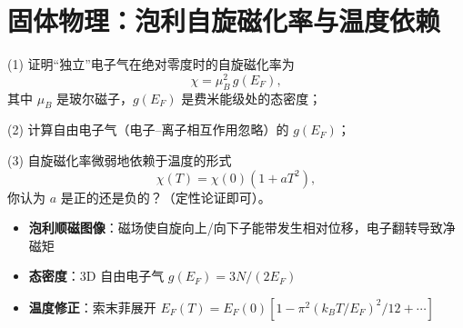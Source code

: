 \section{固体物理：泡利自旋磁化率与温度依赖}
\label{sec:pauli-susceptibility}

\begin{modelbox}[题目：独立电子气的自旋磁化率]
(1) 证明``独立''电子气在绝对零度时的自旋磁化率为
\begin{equation*}
\chi=\mu_B^2\,g(E_F),
\end{equation*}
其中 $\mu_B$ 是玻尔磁子，$g(E_F)$ 是费米能级处的态密度；

(2) 计算自由电子气（电子--离子相互作用忽略）的 $g(E_F)$；

(3) 自旋磁化率微弱地依赖于温度的形式
\begin{equation*}
\chi(T)=\chi(0)\left(1+aT^2\right),
\end{equation*}
你认为 $a$ 是正的还是负的？（定性论证即可）。
\end{modelbox}

\begin{tipbox}[考点快速分析]
\begin{itemize}
    \item \textbf{泡利顺磁图像}：磁场使自旋向上/向下子能带发生相对位移，电子翻转导致净磁矩
    \item \textbf{态密度}：3D 自由电子气 $g(E_F)=3N/(2E_F)$
    \item \textbf{温度修正}：索末菲展开 $E_F(T)=E_F(0)[1-\pi^2(k_BT/E_F)^2/12+\cdots]$
\end{itemize}
\end{tipbox}


